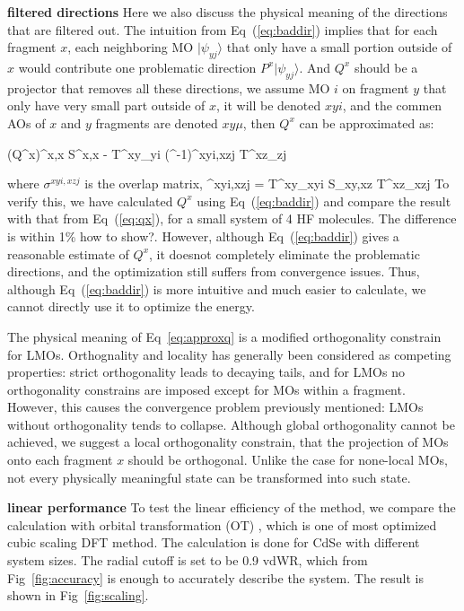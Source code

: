 \documentclass[prl,twocolumn,showpacs]{revtex4}
\begin{document}
\textbf{filtered directions}
Here we also discuss the physical meaning of the directions that are filtered out. The intuition from Eq~(\ref{eq:baddir}) implies that for each fragment $x$, each neighboring MO $|\psi_{yj}\rangle$ that only have a small portion outside of $x$ would contribute one problematic direction $P^x | \psi_{yj}\rangle$. And $Q^x$ should be a projector that removes all these directions, we assume MO $i$ on fragment $y$ that only have very small part outside of $x$, it will be denoted $xyi$, and the commen AOs of $x$ and $y$ fragments are denoted $xy\mu$, then $Q^x$ can be approximated as:

\bea
(Q^x)^{x\mu,x\nu} \approx S^{x\mu,x\nu} - T^{xy\mu}_{yi} (\sigma^{-1})^{xyi,xzj} T^{xz\mu}_{zj}
\label{eq:approxq}
\eea

where $\sigma^{xyi,xzj}$ is the overlap matrix,
\bea
\sigma^{xyi,xzj} = T^{xy\mu}_{xyi} S_{xy\mu,xz\nu} T^{xz\nu}_{xzj}
\eea
To verify this, we have calculated $Q^x$ using Eq~(\ref{eq:baddir}) and compare the result with that from Eq~(\ref{eq:qx}), for a small system of 4 HF molecules. The difference is within 1\% \new how to show?\old. However, although Eq~(\ref{eq:baddir}) gives a reasonable estimate of $Q^x$, it doesnot completely eliminate the problematic directions, and the optimization still suffers from convergence issues. Thus, although Eq~(\ref{eq:baddir}) is more intuitive and much easier to calculate, we cannot directly use it to optimize the energy.

The physical meaning of Eq~\ref{eq:approxq} is a modified orthogonality constrain for LMOs. Orthognality and locality has generally been considered as competing properties: strict orthogonality leads to decaying tails, and for LMOs no orthogonality constrains are imposed except for MOs within a fragment. However, this causes the convergence problem previously mentioned: LMOs without orthogonality tends to collapse. Although global orthogonality cannot be achieved, we suggest a local orthogonality constrain, that the projection of MOs onto each fragment $x$ should be orthogonal. Unlike the case for none-local MOs, not every physically meaningful state can be transformed into such state.

\textbf{linear performance}
To test the linear efficiency of the method, we compare the calculation with orbital transformation (OT) \cite{weber2008direct,vandevondele2003efficient}, which is one of most optimized cubic scaling DFT method. The calculation is done for CdSe with different system sizes. The radial cutoff is set to be 0.9 vdWR, which from Fig~\ref{fig:accuracy} is enough to accurately describe the system. The result is shown in Fig~\ref{fig:scaling}.
\end{document}
